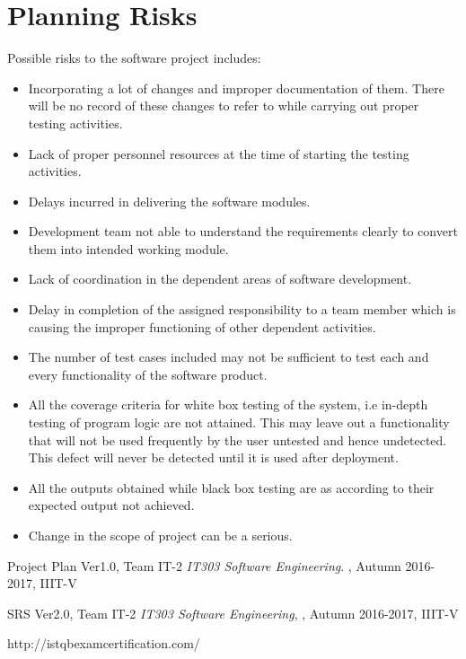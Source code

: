 \documentclass[12pt]{article}
\begin{document}
\section{Planning Risks}
Possible risks to the software project includes:
\begin{itemize}
    \item Incorporating a lot of changes and improper documentation of them. There will be no record of these changes to refer to while carrying out proper testing activities.
    \item Lack of proper personnel resources at the time of starting the testing activities.
    \item Delays incurred in delivering the software modules.
    \item Development team not able to understand the requirements clearly to convert them into intended working module.
    \item Lack of coordination in the dependent areas of software development.
    \item Delay in completion of the assigned responsibility to a team member which is causing the improper functioning of other dependent activities.
    \item The number of test cases included may not be sufficient to test each and every functionality of the software product.
    \item All the coverage criteria for white box testing of the system, i.e in-depth testing of program logic are not attained. This may leave out a functionality that will not be used frequently by the user untested and hence undetected. This defect will never be detected until it is used after deployment.
    \item All the outputs obtained while black box testing are as according to their expected output not achieved.
    \item Change in the scope of project can be a serious.
    \end{itemize}
    

\begin{thebibliography}{9}

Project Plan Ver1.0, Team IT-2
\textit{IT303 Software Engineering}. 
, Autumn 2016-2017, IIIT-V

SRS Ver2.0, Team IT-2
\textit{IT303 Software Engineering}, 
, Autumn 2016-2017, IIIT-V

http://istqbexamcertification.com/
\end{thebibliography}
\end{document}
